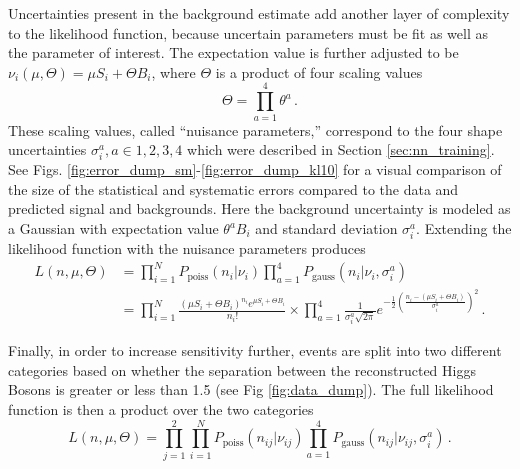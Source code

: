     Uncertainties present in the background estimate add another layer of complexity to the likelihood function,
        because uncertain parameters must be fit as well as the parameter of interest.
    The expectation value is further adjusted to be $\nu_i(\mu, \Theta) = \mu S_i + \Theta B_i$,
        where $\Theta$ is a product of four scaling values 
    \begin{equation}
        \Theta = \prod \limits_{a=1}^{4}  \theta^a
        \,.
    \end{equation}
    These scaling values, called ``nuisance parameters,''
        correspond to the four \mhh shape uncertainties $\sigma_i^a, a\in{1,2,3,4}$
        which were described in Section \ref{sec:nn_training}.
    See Figs. \ref{fig:error_dump_sm}-\ref{fig:error_dump_kl10} for a visual comparison of the size of the statistical and systematic errors
        compared to the data and predicted signal and backgrounds.
    Here the background uncertainty is modeled as a Gaussian with expectation value $\theta^a B_i$ and standard deviation $\sigma_i^a$.
    Extending the likelihood function with the nuisance parameters produces
    \begin{equation} \begin{split}
        L(n,\mu,\Theta) &= \prod \limits_{i=1}^{N} P_{\textrm{poiss}}(n_i | \nu_i) 
             \prod \limits_{a=1}^{4} P_{\textrm{gauss}}(n_i | \nu_i, \sigma_i^a) 
        \\&= \prod \limits_{i=1}^{N} \frac{ (\mu S_i + \Theta B_i)^{n_i} e^{\mu S_i + \Theta B_i} }{n_i!} \times
            \prod \limits_{a=1}^4 \frac{1}{\sigma_i^a \sqrt{2\pi}} e^{
                -\frac{1}{2}\left(\frac{n_i- (\mu S_i + \Theta B_i)}{\sigma_i^a}\right)^2
            }
        \,.
    \end{split} \end{equation}

    Finally, in order to increase sensitivity further, events are split into two different categories
        based on whether the \deta separation between the reconstructed Higgs Bosons is greater or less than 1.5 (see Fig \ref{fig:data_dump}).
    The full likelihood function is then a product over the two categories
    \begin{equation}
        L(n,\mu,\Theta) = \prod \limits_{j=1}^{2}
             \prod \limits_{i=1}^{N} P_{\textrm{poiss}}(n_{ij} | \nu_{ij}) 
             \prod \limits_{a=1}^{4} P_{\textrm{gauss}}(n_{ij} | \nu_{ij}, \sigma_{i}^a) 
        \,.
    \end{equation}



